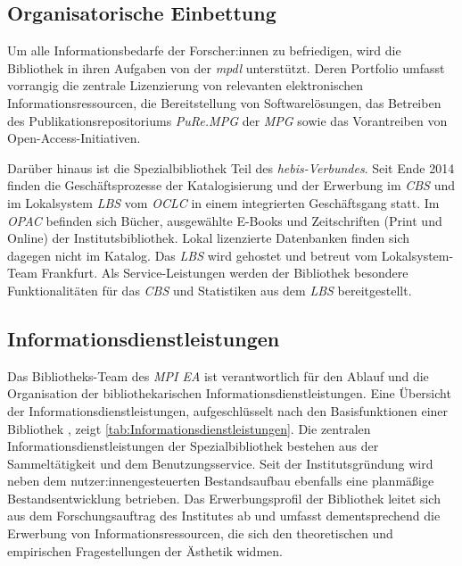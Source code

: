 \subsection{Organisatorische Einbettung}
Um alle Informationsbedarfe der Forscher:innen zu befriedigen, wird die Bibliothek in ihren Aufgaben von der
\textit{\acrlong{mpdl}} unterstützt. Deren Portfolio umfasst vorrangig die zentrale 
Lizenzierung von relevanten elektronischen Informationsressourcen, die Bereitstellung von Softwarelösungen, 
das Betreiben des Publikationsrepositoriums \textit{\acrshort{PuRe.MPG}} der \textit{\acrfull{MPG}} sowie
das Vorantreiben von Open-Access-Initiativen. 

Darüber hinaus ist die Spezialbibliothek Teil des \textit{\acrshort{hebis}-Verbundes}. 
Seit Ende 2014 finden die Geschäftsprozesse der Katalogisierung und der Erwerbung im \textit{\acrfull{CBS}} und 
im Lokalsystem \textit{\acrfull{LBS}} vom \textit{\acrshort{OCLC}} in einem integrierten Geschäftsgang statt. Im \textit{\acrfull{OPAC}} befinden sich Bücher, ausgewählte E-Books 
und Zeitschriften (Print und Online) der Institutsbibliothek. Lokal lizenzierte Datenbanken finden sich dagegen
nicht im Katalog. Das \textit{\acrshort{LBS}} wird gehostet und betreut 
vom Lokalsystem-Team Frankfurt. Als Service-Leistungen werden der Bibliothek besondere Funktionalitäten 
für das \textit{\acrlong{CBS}} und Statistiken aus dem \textit{\acrshort{LBS}} bereitgestellt.


\subsection{Informationsdienstleistungen}
Das Bibliotheks-Team des \textit{\acrshort{MPI EA}} ist verantwortlich für den Ablauf und die Organisation der bibliothekarischen 
Informationsdienstleistungen. Eine Übersicht der Informationsdienstleistungen,
aufgeschlüsselt nach den Basisfunktionen einer Bibliothek \cite[S. 204 f.]{rosch_bibliotheken_2019}, zeigt \autoref{tab:Informationsdienstleistungen}. 
Die zentralen Informationsdienstleistungen der Spezialbibliothek bestehen aus der Sammeltätigkeit und dem Benutzungsservice.
Seit der Institutsgründung wird neben dem nutzer:innengesteuerten Bestandsaufbau ebenfalls eine planmäßige 
Bestandsentwicklung betrieben. Das Erwerbungsprofil der Bibliothek leitet sich aus dem Forschungsauftrag des Institutes 
ab und umfasst dementsprechend die Erwerbung von Informationsressourcen, die sich den theoretischen und 
empirischen Fragestellungen der Ästhetik widmen.


